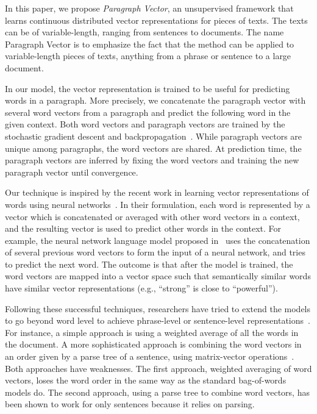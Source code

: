 \documentclass{article}
\begin{document}
In this paper, we propose \emph{Paragraph Vector}, an unsupervised
framework that learns continuous distributed vector representations
for pieces of texts. The texts can be of variable-length, ranging from
sentences to documents. The name Paragraph Vector is to emphasize the
fact that the method can be applied to variable-length pieces of
texts, anything from a phrase or sentence to a large document.

In our model, the vector representation is trained to be useful for
predicting words in a paragraph.  More precisely, we concatenate the
paragraph vector with several word vectors from a paragraph and
predict the following word in the given context. Both word vectors and
paragraph vectors are trained by the stochastic gradient descent and
backpropagation~\cite{rumelhart1986learning}. While paragraph vectors
are unique among paragraphs, the word vectors are shared. At
prediction time, the paragraph vectors are inferred by fixing the word
vectors and training the new paragraph vector until convergence.

Our technique is inspired by the recent work in learning vector
representations of words using neural
networks~\cite{bengio2006neural,collobert2008unified,mnih2008scalable,turian2010word,mikolov,phrases0}.
In their formulation, each word is represented by a vector which is
concatenated or averaged with other word vectors in a context, and the
resulting vector is used to predict other words in the context.  For
example, the neural network language model proposed
in~\cite{bengio2006neural} uses the concatenation of several previous
word vectors to form the input of a neural network, and tries to
predict the next word.
The outcome is that after the model is trained, the word vectors are
mapped into a vector space such that semantically similar words have
similar vector representations (e.g., ``strong'' is close to
``powerful'').

Following these successful techniques, researchers have tried to
extend the models to go beyond word level to achieve phrase-level or
sentence-level
representations~\cite{mitchell10,zanzotto10,yessenalina11,
  grefen13,phrases0}. For instance, a simple approach is using a
weighted average of all the words in the document. A more
sophisticated approach is combining the word vectors in an order given
by a parse tree of a sentence, using matrix-vector
operations~\cite{socher2011parsing}.  Both approaches have
weaknesses. The first approach, weighted averaging of word vectors,
loses the word order in the same way as the standard bag-of-words
models do. The second approach, using a parse tree to combine word
vectors, has been shown to work for only sentences because it relies
on parsing.
\end{document}
